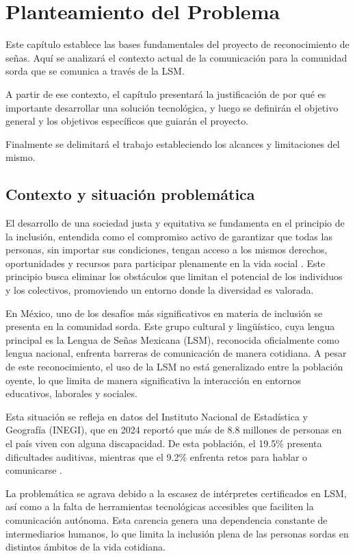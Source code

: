 	\section{Planteamiento del Problema}
	Este capítulo establece las bases fundamentales del proyecto de reconocimiento de señas. Aquí se analizará el contexto actual de la comunicación para la comunidad sorda que se comunica a través de la LSM. 
	 
	A partir de ese contexto, el capítulo presentará la justificación de por qué es importante desarrollar una solución tecnológica, y luego se definirán el objetivo general y los objetivos específicos que guiarán el proyecto. 
	
	Finalmente se delimitará el trabajo estableciendo los alcances y limitaciones del mismo. 
	
	
	\subsection{Contexto y situación problemática}
	
	El desarrollo de una sociedad justa y equitativa se fundamenta en el principio de la inclusión, entendida como el compromiso activo de garantizar que todas las personas, sin importar sus condiciones, tengan acceso a los mismos derechos, oportunidades y recursos para participar plenamente en la vida social \cite{unadm2024}. Este principio busca eliminar los obstáculos que limitan el potencial de los individuos y los colectivos, promoviendo un entorno donde la diversidad es valorada.
	
	En México, uno de los desafíos más significativos en materia de inclusión se presenta en la comunidad sorda. Este grupo cultural y lingüístico, cuya lengua principal es la Lengua de Señas Mexicana (LSM), reconocida oficialmente como lengua nacional, enfrenta barreras de comunicación de manera cotidiana. A pesar de este reconocimiento, el uso de la LSM no está generalizado entre la población oyente, lo que limita de manera significativa la interacción en entornos educativos, laborales y sociales.
	
	Esta situación se refleja en datos del Instituto Nacional de Estadística y Geografía (INEGI), que en 2024 reportó que más de 8.8 millones de personas en el país viven con alguna discapacidad. De esta población, el 19.5\% presenta dificultades auditivas, mientras que el 9.2\% enfrenta retos para hablar o comunicarse \cite{inegi2024}.
	
	La problemática se agrava debido a la escasez de intérpretes certificados en LSM, así como a la falta de herramientas tecnológicas accesibles que faciliten la comunicación autónoma. Esta carencia genera una dependencia constante de intermediarios humanos, lo que limita la inclusión plena de las personas sordas en distintos ámbitos de la vida cotidiana.
	
